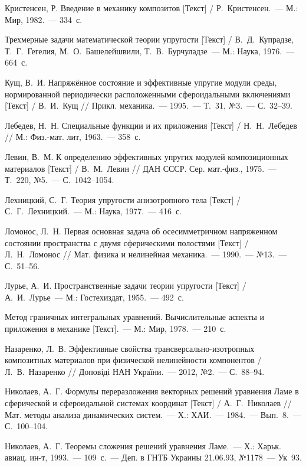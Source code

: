 \begin{biblist}{99}
Кристенсен, Р. 
Введение в механику композитов [Текст] 
/ Р.~Кристенсен.~--- М.: Мир, 1982.~--- 334~с.

Трехмерные задачи математической теории упругости [Текст] 
/ В.~Д.~Купрадзе, Т.~Г.~Гегелия, М.~О.~Башелейшвили, Т.~В.~Бурчуладзе~--- М.: Наука, 1976.~--- 664~с.

Кущ, В.~И. 
Напряжённое состояние и эффективные упругие модули среды, нормированной периодически расположенными сфероидальными включениями [Текст] 
/ В.~И.~Кущ 
// Прикл. механика.~--- 1995.~--- Т.~31, №3.~--- С.~32--39.

Лебедев, Н.~Н. 
Специальные функции и их приложения [Текст] 
/ Н.~Н.~Лебедев
// М.: Физ.-мат. лит, 1963.~--- 358~с.

Левин, В.~М. 
К определению эффективных упругих модулей композиционных материалов [Текст] 
/ В.~М.~Левин 
// ДАН СССР. Сер. мат.-физ., 1975.~--- Т.~220, №5.~--- С.~1042--1054.

Лехницкий, С.~Г. 
Теория упругости анизотропного тела [Текст] 
/ С.~Г.~Лехницкий.~--- М.: Наука, 1977.~--- 416~с.

Ломонос, Л.~Н. 
Первая основная задача об осесимметричном напряженном состоянии пространства с двумя сферическими полостями [Текст] 
/ Л.~Н.~Ломонос 
// Мат. физика и нелинейная механика.~--- 1990.~--- №13.~--- С.~51--56.

Лурье, А.~И. 
Пространственные задачи теории упругости [Текст] 
/ А.~И.~Лурье~--- М.: Гостехиздат, 1955.~--- 492~с.

Метод граничных интегральных уравнений. Вычислительные аспекты и приложения в механике [Текст].~--- М.: Мир, 1978.~--- 210~с.

Назаренко, Л.~В. 
Эффективные свойства трансверсально-изотропных композитных материалов при физической нелинейности компонентов 
/ Л.~В.~Назаренко 
// Доповіді НАН України.~--- 2012, №2.~--- С.~88--94.


Николаев, А.~Г. 
Формулы переразложения векторных решений уравнения Ламе в сферической и сфероидальной системах координат [Текст] 
/ А.~Г.~Николаев 
// Мат. методы анализа динамических систем.~--- Х.: ХАИ.~--- 1984.~--- Вып.~8.~--- С.~100--104.

Николаев, А.~Г. 
Теоремы сложения решений уравнения Ламе.~--- Х.: Харьк. авиац. ин-т, 1993.~--- 109~с.~--- Деп. в ГНТБ Украины 21.06.93, №1178~--- Ук~93.


\end{biblist}
